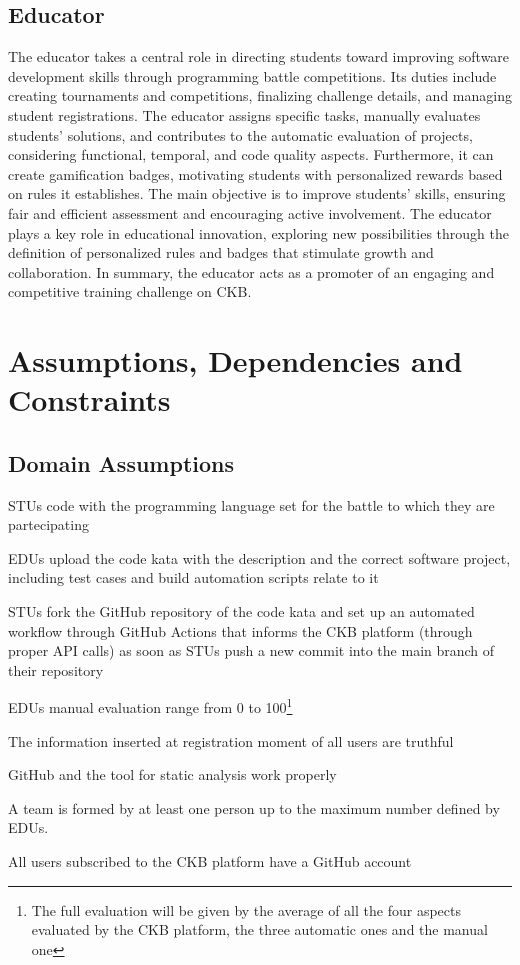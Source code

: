 \subsection*{Educator}
The educator takes a central role in directing students toward improving software development skills through programming battle competitions. 
Its duties include creating tournaments and competitions, finalizing challenge details, and managing student registrations. 
The educator assigns specific tasks, manually evaluates students' solutions, and contributes to the automatic evaluation of projects, considering functional, temporal, and code quality aspects. 
Furthermore, it can create gamification badges, motivating students with personalized rewards based on rules it establishes. 
The main objective is to improve students' skills, ensuring fair and efficient assessment and encouraging active involvement. 
The educator plays a key role in educational innovation, exploring new possibilities through the definition of personalized rules and badges that stimulate growth and collaboration. 
In summary, the educator acts as a promoter of an engaging and competitive training challenge on CKB.

\section{Assumptions, Dependencies and Constraints}

\subsection{Domain Assumptions}
\begin{assumptionsenumerate}
    \item STUs code with the programming language set for the battle to which they are partecipating
    \item EDUs upload the code kata with the description and the correct software project, including test cases and build automation scripts relate to it
    \item STUs fork the GitHub repository of the code kata and set up an automated workflow through GitHub Actions that informs the CKB platform (through proper API calls) as soon as STUs push a new commit into the main branch of their repository
    \item EDUs manual evaluation range from 0 to 100\footnote{The full evaluation will be given by the average of all the four aspects evaluated by the CKB platform, the three automatic ones and the manual one}
    \item The information inserted at registration moment of all users are truthful
    \item GitHub and the tool for static analysis work properly
    \item A team is formed by at least one person up to the maximum number defined by EDUs.
    \item All users subscribed to the CKB platform have a GitHub account
\end{assumptionsenumerate}

